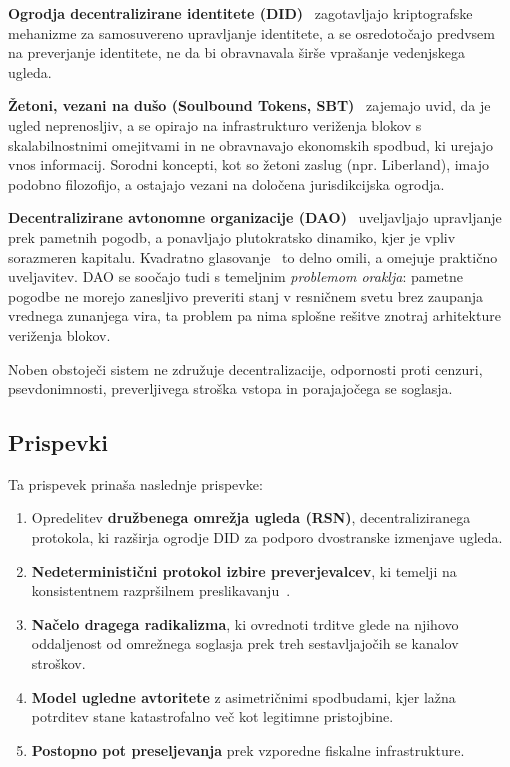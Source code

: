 \documentclass[11pt,a4paper,twocolumn]{article}
\begin{document}
\textbf{Ogrodja decentralizirane identitete (DID)}~\cite{did2022} zagotavljajo kriptografske mehanizme za samosuvereno upravljanje identitete, a se osredotočajo predvsem na preverjanje identitete, ne da bi obravnavala širše vprašanje vedenjskega ugleda.

\textbf{Žetoni, vezani na dušo (Soulbound Tokens, SBT)}~\cite{weyl2022} zajemajo uvid, da je ugled neprenosljiv, a se opirajo na infrastrukturo veriženja blokov s skalabilnostnimi omejitvami in ne obravnavajo ekonomskih spodbud, ki urejajo vnos informacij. Sorodni koncepti, kot so žetoni zaslug (npr. Liberland), imajo podobno filozofijo, a ostajajo vezani na določena jurisdikcijska ogrodja.

\textbf{Decentralizirane avtonomne organizacije (DAO)}~\cite{buterin2014} uveljavljajo upravljanje prek pametnih pogodb, a ponavljajo plutokratsko dinamiko, kjer je vpliv sorazmeren kapitalu. Kvadratno glasovanje~\cite{buterin2019} to delno omili, a omejuje praktično uveljavitev. DAO se soočajo tudi s temeljnim \emph{problemom oraklja}: pametne pogodbe ne morejo zanesljivo preveriti stanj v resničnem svetu brez zaupanja vrednega zunanjega vira, ta problem pa nima splošne rešitve znotraj arhitekture veriženja blokov.

Noben obstoječi sistem ne združuje decentralizacije, odpornosti proti cenzuri, psevdonimnosti, preverljivega stroška vstopa in porajajočega se soglasja.

\subsection{Prispevki}

Ta prispevek prinaša naslednje prispevke:
\begin{enumerate}[nosep]
\item Opredelitev \textbf{družbenega omrežja ugleda (RSN)}, decentraliziranega protokola, ki razširja ogrodje DID za podporo dvostranske izmenjave ugleda.
\item \textbf{Nedeterministični protokol izbire preverjevalcev}, ki temelji na konsistentnem razpršilnem preslikavanju~\cite{karger1997}.
\item \textbf{Načelo dragega radikalizma}, ki ovrednoti trditve glede na njihovo oddaljenost od omrežnega soglasja prek treh sestavljajočih se kanalov stroškov.
\item \textbf{Model ugledne avtoritete} z asimetričnimi spodbudami, kjer lažna potrditev stane katastrofalno več kot legitimne pristojbine.
\item \textbf{Postopno pot preseljevanja} prek vzporedne fiskalne infrastrukture.
\end{enumerate}
\end{document}
